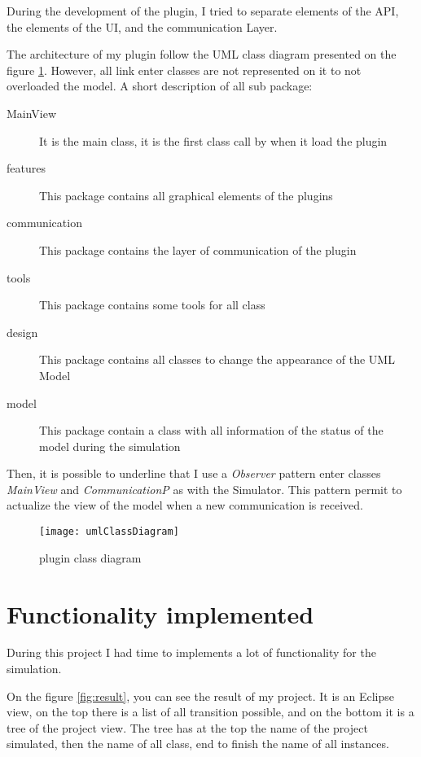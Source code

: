During the development of the plugin, I tried to separate elements of the \umld API, the elements of the UI, and the communication Layer.

The architecture of my plugin follow the UML class diagram presented on the figure \ref{fig:classDiagram}. However, all link enter classes are not represented on it to not overloaded the model. A short description of all sub package:

\noitemsep
\begin{description}
\item[MainView] It is the main class, it is the first class call by \umld when it load the plugin
\item[features] This package contains all graphical elements of the plugins
\item[communication] This package contains the layer of communication of the plugin
\item[tools] This package contains some tools for all class
\item[design] This package contains all classes to change the appearance of the UML Model
\item[model] This package contain a class with all information of the status of the model during the simulation
\end{description}
\doitemsep

Then, it is possible to underline that I use a \textit{Observer} pattern enter classes \textit{MainView} and \textit{CommunicationP} as with the Simulator. This pattern permit to actualize the view of the model when a new communication is received.

\begin{figure}[h]
  \centering
  \texttt{[image: umlClassDiagram]}
  \caption{plugin class diagram}
  \label{fig:classDiagram}
\end{figure}



\section{Functionality implemented}

During this project I had time to implements a lot of functionality for the simulation.


On the figure \ref{fig:result}, you can see the result of my project. It is an Eclipse view, on the top there is a list of all transition possible, and on the bottom it is a tree of the project view. The tree has at the top the name of the project simulated, then the name of all class, end to finish the name of all instances.

